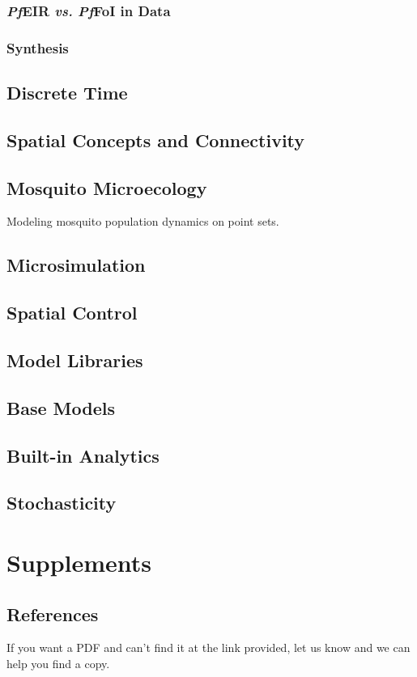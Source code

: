 \documentclass[
]{book}
\begin{document}
\section{\texorpdfstring{\emph{Pf}EIR \emph{vs.} \emph{Pf}FoI in Data}{PfEIR vs. PfFoI in Data}}\label{pfeir-vs.-pffoi-in-data}

\section{Synthesis}\label{synthesis-1}

\chapter{Discrete Time}\label{discrete-time}

\chapter{Spatial Concepts and Connectivity}\label{spatial-concepts-and-connectivity}

\chapter{Mosquito Microecology}\label{mosquito-microecology}

Modeling mosquito population dynamics on point sets.

\chapter{Microsimulation}\label{microsimulation}

\chapter{Spatial Control}\label{spatial-control}

\chapter{Model Libraries}\label{model-libraries}

\chapter{Base Models}\label{base-models}

\chapter{Built-in Analytics}\label{built-in-analytics}

\chapter{Stochasticity}\label{stochasticity}

\part{Supplements}\label{part-supplements}

\chapter{References}\label{references}

If you want a PDF and can't find it at the link provided, let us know and we can help you find a copy.

\printbibliography
\end{document}
